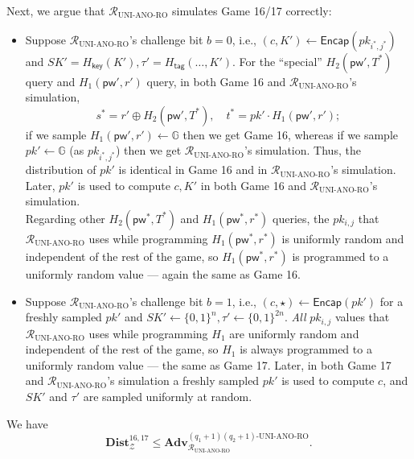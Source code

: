 \documentclass{article}
\theoremstyle{plain}
\theoremstyle{definition}
\theoremstyle{remark}
\newcommand{\group}{\mathbb{G}}
\newcommand{\env}{\mathcal{Z}}
\newcommand{\red}{\mathcal{R}}
\newcommand{\Adv}{\mathbf{Adv}}
\newcommand{\Dist}{\mathbf{Dist}}
\newcommand{\Encap}{\mathsf{Encap}}
\newcommand{\Hkey}{H_\mathsf{key}}
\newcommand{\Htag}{H_\mathsf{tag}}
\newcommand{\pw}{\mathsf{pw}}
\begin{document}
Next, we argue that $\red_\text{UNI-ANO-RO}$ simulates Game 16/17 correctly:
\begin{itemize}
  \item Suppose $\red_\text{UNI-ANO-RO}$'s challenge bit $b = 0$, i.e., $(c,K') \gets \Encap(pk_{i^*,j^*})$ and $SK' = \Hkey(K'), \tau' = \Htag(\dots,K')$. For the ``special'' $H_2(\pw',T^*)$ query and $H_1(\pw',r')$ query, in both Game 16 and $\red_\text{UNI-ANO-RO}$'s simulation,
      \[
      s^* = r' \oplus H_2(\pw',T^*), \quad t^* = pk' \cdot H_1(\pw',r');
      \]
      if we sample $H_1(\pw',r') \gets \group$ then we get Game 16, whereas if we sample $pk' \gets \group$ (as $pk_{i^*,j^*}$) then we get $\red_\text{UNI-ANO-RO}$'s simulation. Thus, the distribution of $pk'$ is identical in Game 16 and in $\red_\text{UNI-ANO-RO}$'s simulation. Later, $pk'$ is used to compute $c,K'$ in both Game 16 and $\red_\text{UNI-ANO-RO}$'s simulation. \\
      Regarding other $H_2(\pw^*,T^*)$ and $H_1(\pw^*,r^*)$ queries, the $pk_{i,j}$ that $\red_\text{UNI-ANO-RO}$ uses while programming $H_1(\pw^*,r^*)$ is uniformly random and independent of the rest of the game, so $H_1(\pw^*,r^*)$ is programmed to a uniformly random value --- again the same as Game 16.
  \item Suppose $\red_\text{UNI-ANO-RO}$'s challenge bit $b = 1$, i.e., $(c,\star) \gets \Encap(pk')$ for a freshly sampled $pk'$ and $SK' \gets \{0,1\}^n, \tau' \gets \{0,1\}^{2n}$. \emph{All} $pk_{i,j}$ values that $\red_\text{UNI-ANO-RO}$ uses while programming $H_1$ are uniformly random and independent of the rest of the game, so $H_1$ is always programmed to a uniformly random value --- the same as Game 17. Later, in both Game 17 and $\red_\text{UNI-ANO-RO}$'s simulation a freshly sampled $pk'$ is used to compute $c$, and $SK'$ and $\tau'$ are sampled uniformly at random.
\end{itemize}
We have
\[
\Dist_\env^{16,17} \leq \Adv_{\red_\text{UNI-ANO-RO}}^{(q_1+1)(q_2+1)\text{-UNI-ANO-RO}}.
\]
\end{document}
